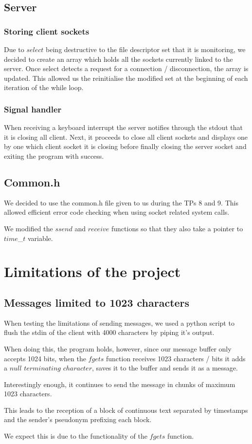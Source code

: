 \documentclass{article}
\begin{document}
\subsection{Server}

\subsubsection{Storing client sockets}
Due to $select$ being destructive to the file descriptor set that it is monitoring, we decided to create an array which holds all the sockets currently linked to the server. Once select detects a request for a connection / disconnection, the array is updated. This allowed us the reinitialise the modified set at the beginning of each iteration of the while loop.

\subsubsection{Signal handler}
When receiving a keyboard interrupt the server notifies through the stdout that it is closing all client. Next, it proceeds to close all client sockets and displays one by one which client socket it is closing before finally closing the server socket and exiting the program with success.

\subsection{Common.h}

We decided to use the common.h file given to us during the TPs 8 and 9. This allowed efficient error code checking when using socket related system calls.\par

We modified the $ssend$ and $receive$ functions so that they also take a pointer to $time$\_$t$ variable. 
\section{Limitations of the project}

\subsection{Messages limited to 1023 characters}
When testing the limitations of sending messages, we used a python script to flush the stdin of the client with 4000 characters by piping it's output. \par 
When doing this, the program holds, however, since our message buffer only accepts 1024 bits, when the $fgets$ function receives 1023 characters / bits it adds a $null$ $terminating$ $character$, saves it to the buffer and sends it as a message. \par
Interestingly enough, it continues to send the message in chunks of maximum 1023 characters. \par
This leads to the reception of a block of continuous text separated by timestamps and the sender's pseudonym prefixing each block. \par
We expect this is due to the functionality of the $fgets$ function.
\end{document}
